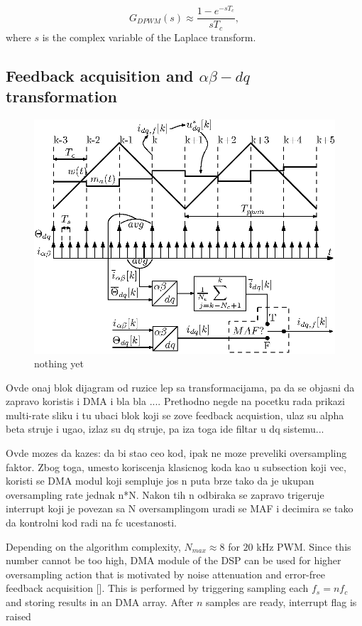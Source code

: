 \documentclass[journal]{IEEEtran}
\begin{document}
\begin{equation}
G_{DPWM}(s) \approx \frac{1-e^{-sT_c}}{sT_c}, 
\label{eq:DPWM_model}  
\end{equation}
where $s$ is the complex variable of the Laplace transform.

\subsection{Feedback acquisition and $\alpha \beta - dq$ transformation}

\begin{figure}[t!]
    \centerline{\includegraphics[width=0.95\linewidth]{figures/timing_diagram.eps}}
    \caption{nothing yet}
    \label{fig:timings}
\end{figure}

Ovde onaj blok dijagram od ruzice lep sa transformacijama, pa da se objasni da zapravo koristis i DMA i bla bla .... Prethodno negde na pocetku rada prikazi multi-rate sliku i tu ubaci blok koji se zove feedback acquistion, ulaz su alpha beta struje i ugao, izlaz su dq struje, pa iza toga ide filtar u dq sistemu...

Ovde mozes da kazes: da bi stao ceo kod, ipak ne moze preveliki oversampling faktor. Zbog toga, umesto koriscenja klasicnog koda kao u subsection koji vec, koristi se DMA modul koji sempluje jos n puta brze tako da je ukupan oversampling rate jednak n*N. Nakon tih n odbiraka se zapravo trigeruje interrupt koji je povezan sa N oversamplingom uradi se MAF i decimira se tako da kontrolni kod radi na fc ucestanosti.

Depending on the algorithm complexity, $N_{max} \approx 8$ for $20$ kHz PWM. Since this number cannot be too high, DMA module of the DSP can be used for higher oversampling action that is motivated by noise attenuation and error-free feedback acquisition []. This is performed by triggering sampling each $f_s = nf_c$ and storing results in an DMA array. After $n$ samples are ready, interrupt flag is raised 
\end{document}
